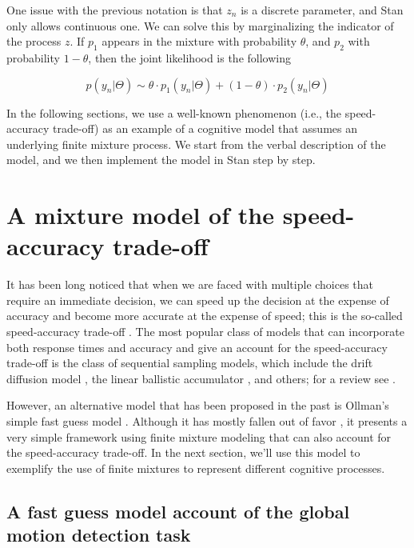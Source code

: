 \documentclass[12pt,]{krantz}
\theoremstyle{definition}
\theoremstyle{definition}
\theoremstyle{definition}
\theoremstyle{remark}
\begin{document}
One issue with the previous notation is that \(z_n\) is a discrete
parameter, and Stan only allows continuous one. We can solve this by
marginalizing the indicator of the process \(z\). If \(p_1\) appears in
the mixture with probability \(\theta\), and \(p_2\) with probability
\(1-\theta\), then the joint likelihood is the following

\begin{equation}
p(y_n | \Theta) \sim \theta \cdot p_1(y_n| \Theta) + (1-\theta) \cdot p_2(y_n | \Theta)
\end{equation}

In the following sections, we use a well-known phenomenon (i.e., the
speed-accuracy trade-off) as an example of a cognitive model that
assumes an underlying finite mixture process. We start from the verbal
description of the model, and we then implement the model in Stan step
by step.

\section{A mixture model of the speed-accuracy
trade-off}\label{a-mixture-model-of-the-speed-accuracy-trade-off}

It has been long noticed that when we are faced with multiple choices
that require an immediate decision, we can speed up the decision at the
expense of accuracy and become more accurate at the expense of speed;
this is the so-called speed-accuracy trade-off
\citep{wickelgren1977speed} . The most popular class of models that can
incorporate both response times and accuracy and give an account for the
speed-accuracy trade-off is the class of sequential sampling models,
which include the drift diffusion model \citep{Ratcliff1978}, the linear
ballistic accumulator \citep{brownSimplestCompleteModel2008}, and
others; for a review see \citet{Ratcliff2016}.

However, an alternative model that has been proposed in the past is
Ollman's simple fast guess model \citep{Ollman1966}. Although it has
mostly fallen out of favor \citep[but see][ for a more modern variant of
this model]{DutilhEtAl2011}, it presents a very simple framework using
finite mixture modeling that can also account for the speed-accuracy
trade-off. In the next section, we'll use this model to exemplify the
use of finite mixtures to represent different cognitive processes.

\subsection{A fast guess model account of the global motion detection
task}\label{a-fast-guess-model-account-of-the-global-motion-detection-task}
\end{document}
